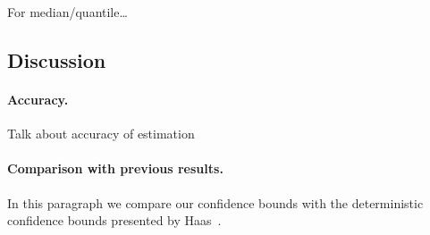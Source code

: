 For median/quantile\ldots {}

\subsection{Discussion}\label{sec:discussion}

\paragraph{Accuracy.} Talk about accuracy of estimation 

\paragraph{Comparison with previous results.} In this paragraph we
compare our confidence bounds with the deterministic confidence bounds presented
by Haas~\cite{Haas97}.  

